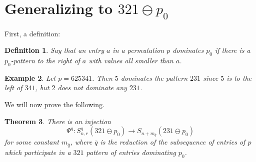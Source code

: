 \documentclass[11pt]{amsart}
\newtheorem{theorem}{Theorem}[section]								\newtheorem{proposition}[theorem]{Proposition}
\newtheorem{definition}[theorem]{Definition}
\newtheorem{example}[theorem]{Example}
\theoremstyle{remark}
\numberwithin{equation}{section}
\begin{document}
\section{Generalizing to $321 \ominus p_0$}
First, a definition:
\begin{definition}
    Say that an entry $a$ in a permutation $p$ \emph{dominates} $p_0$ if there is a $p_0$-pattern to the right of $a$ with values all smaller than $a$.
\end{definition}

\begin{example}
    Let $p = 625341$. Then $5$ dominates the pattern $231$ since $5$ is to the left of $341$, but $2$ does not dominate any $231$.
\end{example}

We will now prove the following.
\\
\begin{theorem}
    There is an injection 
    \[
    \Psi^q:S^q_{n,r}(321 \ominus p_0) \rightarrow S_{n + m_{\overline{q}}}(231 \ominus p_0)
    \]
    for some constant $m_{\overline{q}}$, where $\overline{q}$ is the reduction of the subsequence of entries of $p$ which participate in a $321$ pattern of entries dominating $p_0$.
\end{theorem}
\end{document}
